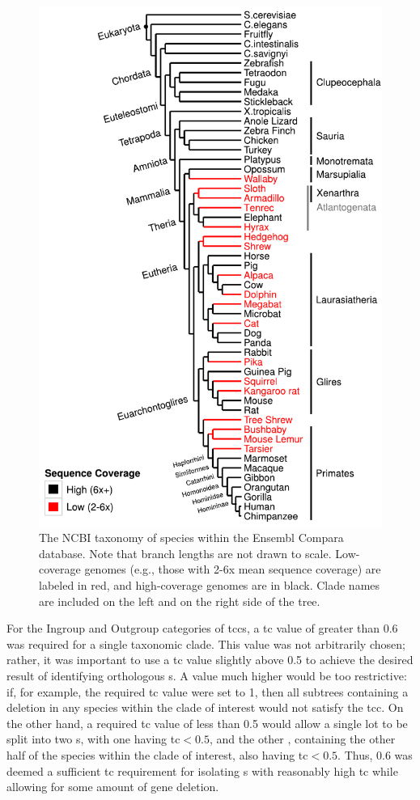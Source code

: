 \begin{figure}
\centering
\includegraphics[scale=0.7]{Figs/species_tree.pdf}
\caption{The NCBI taxonomy of species within the Ensembl Compara
  database. Note that branch lengths are not drawn to
  scale. Low-coverage genomes (e.g., those with 2-6x mean sequence
  coverage) are labeled in red, and high-coverage genomes are in
  black. Clade names are included on the left and on the right side of
  the tree.}
\label{fig_ncbi_tree}
\end{figure}

For the Ingroup and Outgroup categories of \acp{tcc}, a \ac{tc} value
of greater than 0.6 was required for a single taxonomic clade. This
value was not arbitrarily chosen; rather, it was important to use a
\ac{tc} value slightly above 0.5 to achieve the desired result of
identifying orthologous \subtr{}s. A value much higher would be too
restrictive: if, for example, the required \ac{tc} value were set to
1, then all subtrees containing a deletion in any species within the
clade of interest would not satisfy the \ac{tcc}. On the other hand, a
required \ac{tc} value of less than 0.5 would allow a single \ac{lot}
to be split into two \subtr{}s, with one \subtr having \ac{tc}$<0.5$,
and the other \subtr, containing the other half of the species within
the clade of interest, also having \ac{tc}$<0.5$. Thus, 0.6 was deemed
a sufficient \ac{tc} requirement for isolating \subtr{}s with
reasonably high \ac{tc} while allowing for some amount of gene
deletion.

